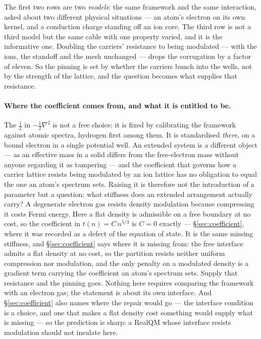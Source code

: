 \documentclass[11pt]{article}
\newcommand{\grad}{\nabla}
\begin{document}
\noindent The first two rows are two \emph{models}: the same framework and the same interaction,
asked about two different physical situations --- an atom's electron on its own kernel, and a
conduction charge standing off an ion core. The third row is not a third model but the same cable
with one property varied, and it is the informative one. Doubling the carriers' resistance to being modulated --- with the ions, the standoff
and the mesh unchanged --- drops the corrugation by a factor of eleven. So the pinning is set by
whether the carriers bunch into the wells, not by the strength of the lattice, and the question
becomes what supplies that resistance.

\paragraph{Where the coefficient comes from, and what it is entitled to be.} The $\tfrac12$ in
$-\tfrac12\grad^2$ is not a free choice: it is fixed by calibrating the framework against atomic
spectra, hydrogen first among them. It is standardised \emph{there}, on a bound electron in a single
potential well. An extended system is a different object --- as an effective mass in a solid differs
from the free-electron mass without anyone regarding it as tampering --- and the coefficient that
governs how a carrier lattice resists being modulated by an ion lattice has no obligation to equal
the one an atom's spectrum sets. Raising it is therefore not the introduction of a parameter but a
question: what stiffness does an extended arrangement actually carry? A degenerate electron gas
resists density modulation because compressing it costs Fermi energy. Here a flat density is admissible on a free
boundary at no cost, so the coefficient in $t(n)=C\,n^{5/3}$ is $C=0$ exactly ---
\S\ref{sec:coefficient}, where it was recorded as a defect of the equation of state. It is the same
missing stiffness, and \S\ref{sec:coefficient} says where it is missing from: the free interface
admits a flat density at no cost, so the partition resists neither uniform compression nor
modulation, and the only penalty on a modulated density is a gradient term carrying the coefficient
an atom's spectrum sets. Supply that resistance and the pinning goes. Nothing here requires
comparing the framework with an electron gas; the statement is about its own interface. And \S\ref{sec:coefficient} also
names where the repair would go --- the interface condition is a choice, and one that makes a flat
density cost something would supply what is missing --- so the prediction is sharp: a RealQM whose
interface resists modulation should not insulate here.
\end{document}
